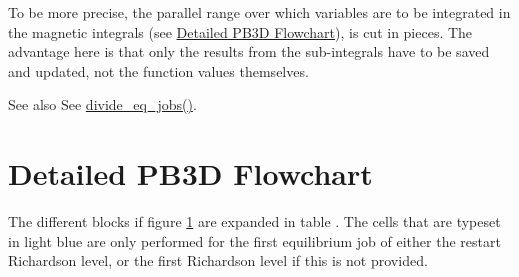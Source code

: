 To be more precise, the parallel range over which variables are to be integrated in the magnetic integrals (see \hyperlink{page_overview_detail_PB3D}{Detailed P\+B3D Flowchart}), is cut in pieces. The advantage here is that only the results from the sub-\/integrals have to be saved and updated, not the function values themselves.

\begin{DoxySeeAlso}{See also}
See \hyperlink{namespaceeq__ops_a8fae749abe55865d8135fef536a8e8f1}{divide\+\_\+eq\+\_\+jobs()}.
\end{DoxySeeAlso}
\hypertarget{page_overview_detail_PB3D}{}\section{Detailed P\+B3\+D Flowchart}\label{page_overview_detail_PB3D}
The different blocks if figure \hyperlink{page_overview_flowchart_fig}{1} are expanded in table . The cells that are typeset in light blue are only performed for the first equilibrium job of either the restart Richardson level, or the first Richardson level if this is not provided. \hypertarget{page_overview_flowchart_PB3D_tab}{}
\tabulinesep=1mm
